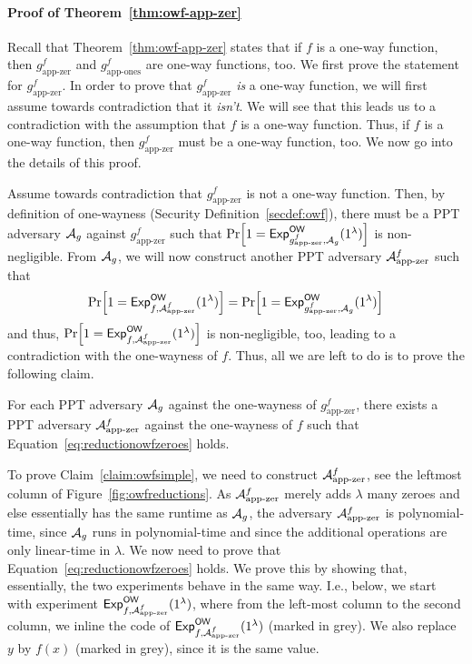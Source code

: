 \paragraph{Proof of Theorem~\ref{thm:owf-app-zer}}
Recall that Theorem~\ref{thm:owf-app-zer} states that if $f$ is a one-way function, then $g^f_{\text{app-zer}}$ and $g^f_{\text{app-ones}}$ are one-way functions, too. We first prove the statement for $g^f_{\text{app-zer}}$.
In order to prove that $g^f_{\text{app-zer}}$ \emph{is} a one-way function, we will first assume towards contradiction that it \emph{isn't}. We will see that this leads us to a contradiction with the assumption that $f$ is a one-way function. Thus, if $f$ is a one-way function, then
$g^f_{\text{app-zer}}$ must be a one-way function, too. We now go into the details of this proof.

Assume towards contradiction that $g^f_{\text{app-zer}}$ is not a one-way function. Then, by definition of one-wayness (Security Definition~\ref{secdef:owf}), there must be a PPT adversary $\mathcal{A}_g$ against $g^f_{\text{app-zer}}$ such that $\prob{1={\mathsf{Exp}}_{g^f_{\text{app-zer}},\adv_g}^{\mathsf{OW}}(1^\lambda)}$ is non-negligible. From $\mathcal{A}_g$, we will now construct another PPT adversary $\mathcal{A}^f_{\text{app-zer}}$ such that 
\begin{equation}\label{eq:reductionowfzeroes}
\prob{1={\mathsf{Exp}}_{f,\adv^f_{\text{app-zer}}}^{\mathsf{OW}}(1^\lambda)}=\prob{1={\mathsf{Exp}}_{g^f_{\text{app-zer}},\adv_g}^{\mathsf{OW}}(1^\lambda)}
\end{equation}
and thus, $\prob{1={\mathsf{Exp}}_{f,\adv^f_{\text{app-zer}}}^{\mathsf{OW}}(1^\lambda)}$ is non-negligible, too, leading to a contradiction with the one-wayness of $f$. Thus, all we are left to do is to prove the following claim.
\begin{claim}\label{claim:owfsimple}
For each PPT adversary $\mathcal{A}_g$ against the one-wayness of $g^f_{\text{app-zer}}$, there exists a PPT adversary $\mathcal{A}^f_{\text{app-zer}}$ against the one-wayness of $f$ such that Equation~\ref{eq:reductionowfzeroes} holds.
\end{claim}
To prove Claim~\ref{claim:owfsimple}, we need to construct $\mathcal{A}^f_{\text{app-zer}}$, see the leftmost column of Figure~\ref{fig:owfreductions}. As $\mathcal{A}^f_{\text{app-zer}}$ merely adds $\lambda$ many zeroes and else essentially has the same runtime as $\mathcal{A}_g$, the adversary $\mathcal{A}^f_{\text{app-zer}}$ is polynomial-time, since $\mathcal{A}_g$ runs in polynomial-time and since the additional operations are only linear-time in $\lambda$. We now need to prove that Equation~\ref{eq:reductionowfzeroes} holds. We prove this by showing that, essentially, the two experiments behave in the same way. I.e., below, we start with experiment ${\mathsf{Exp}}_{f,\mathcal{A}^f_{\text{app-zer}}}^{\mathsf{OW}}(1^\lambda)$, where from the left-most column to the second column, we inline the code of ${\mathsf{Exp}}_{f,\mathcal{A}^f_{\text{app-zer}}}^{\mathsf{OW}}(1^\lambda)$ (marked in grey). We also replace $y$ by $f(x)$ (marked in grey), since it is the same value.
